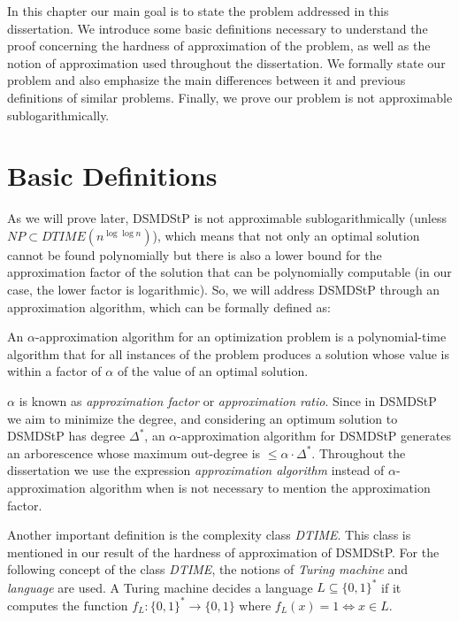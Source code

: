 \label{sec:problem}
\acresetall

In this chapter our main goal is to state the problem addressed in this dissertation. We introduce some basic definitions necessary to understand the proof concerning the hardness of approximation of the problem, as well 
as the notion of approximation used throughout the dissertation. We formally state our problem and also emphasize the main differences between it and previous 
definitions of similar problems. Finally, we prove our problem is not approximable sublogarithmically.

\section{Basic Definitions}
 As we will prove later, DSMDStP is not approximable sublogarithmically (unless $NP \subset DTIME(n^{\log \log{n}})$), which means that not only an optimal solution cannot be found polynomially 
but there is also a lower bound for the approximation factor of the solution that can be polynomially computable (in our case, the lower factor is logarithmic). 
So, we will address DSMDStP through an approximation algorithm, which can be formally defined as:

\begin{Def}
\cite{Williamson2011} An $\alpha$-approximation algorithm for an optimization problem is a polynomial-time algorithm that for all instances of the problem produces a solution 
whose value is within a factor of $\alpha$ of the value of an optimal solution.
\end{Def}

$\alpha$ is known as \emph{approximation factor} or \emph{approximation ratio}. Since in DSMDStP we aim to minimize the degree, and considering an optimum solution to DSMDStP has degree $\Delta^*$, an $\alpha$-approximation algorithm 
for DSMDStP generates an arborescence whose maximum out-degree is $\le \alpha \cdot \Delta^*$. Throughout the dissertation we use the expression 
\emph{approximation algorithm} instead of $\alpha$-approximation algorithm when is not necessary to mention the approximation factor.

Another important definition is the complexity class \emph{DTIME}. This class is mentioned in our result of the hardness of approximation of DSMDStP. 
For the following concept of the class \emph{DTIME}, the notions of \emph{Turing machine} and \emph{language} are used. A Turing machine 
decides a language $L \subseteq \lbrace 0,1 \rbrace^*$ if it computes the function $f_L : \lbrace 0,1 \rbrace^* \rightarrow \lbrace 0,1 \rbrace$ 
where $f_L(x) = 1 \Leftrightarrow x \in L$.

